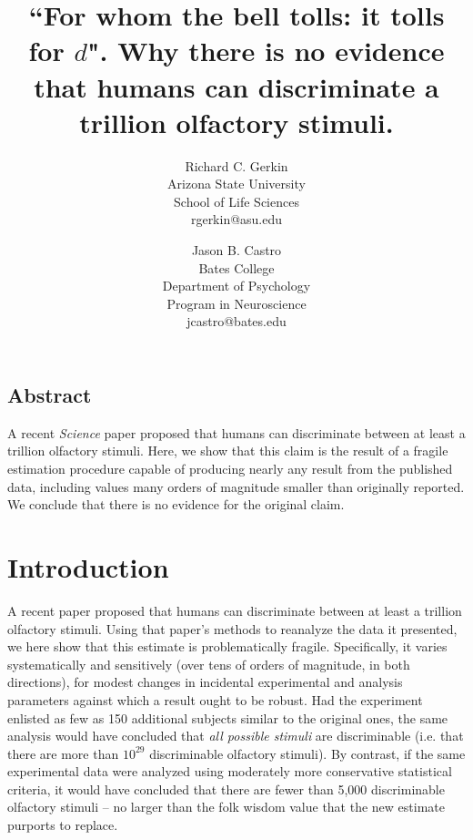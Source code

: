 \documentclass[letterpaper,twocolumn,10pt]{article}
\begin{document}
\setcounter{table}{0}
\setcounter{section}{0}

\date{}

\title{\Large \bf ``For whom the bell tolls: it tolls for $d$".  Why there is no evidence that humans can discriminate a trillion olfactory stimuli.}

\author{
{\rm Richard C. Gerkin}\\
Arizona State University\\
School of Life Sciences\\
rgerkin@asu.edu
\and
{\rm Jason B. Castro}\\
Bates College\\
Department of Psychology\\
Program in Neuroscience \\
jcastro@bates.edu
}

\maketitle

\thispagestyle{empty}


\subsection*{Abstract}
A recent \textit{Science} paper \cite{bushdid_humans_2014} proposed that humans can discriminate between at least a trillion olfactory stimuli. 
Here, we show that this claim is the result of a fragile estimation procedure capable of producing nearly any result from the published data, 
including values many orders of magnitude smaller than originally reported. 
We conclude that there is no evidence for the original claim.  

\section{Introduction}
\label{sec:intro}
A recent paper \cite{bushdid_humans_2014} proposed that humans can discriminate between at least a trillion olfactory stimuli. 
Using that paper's methods to reanalyze the data it presented, 
we here show that this estimate is problematically fragile. 
Specifically, it varies systematically and sensitively 
(over tens of orders of magnitude, in both directions), 
for modest changes in incidental experimental and analysis parameters against which a result ought to be robust.  
Had the experiment enlisted as few as 150 additional subjects similar to the original ones, 
the same analysis would have concluded that \textit{all possible stimuli} are discriminable 
(i.e. that there are more than $10^{29}$ discriminable olfactory stimuli). 
By contrast, if the same experimental data were analyzed using moderately more conservative statistical criteria, 
it would have concluded that there are fewer than 5,000 discriminable olfactory stimuli -- 
no larger than the folk wisdom value that the new estimate purports to replace. 
\end{document}
